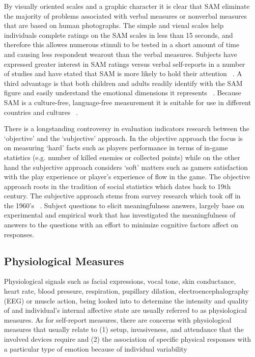 By visually oriented scales and a graphic character it is clear that SAM eliminate the majority of problems associated with verbal measures or nonverbal measures that are based on human photographs. The simple and visual scales help individuals complete ratings on the SAM scales in less than 15 seconds, and therefore this allowes numerous stimuli to be tested in a short amount of time and causing less respondent wearout than the verbal measures. Subjects have expressed greater interest in SAM ratings versus verbal self-reports in a number of studies and have stated that SAM is more likely to hold their attention ~\cite{lang1985cognitive}. A third advantage is that both children and adults readily identify with the SAM figure and easily understand the emotional dimensions it represents ~\cite{lang1985cognitive}. Because SAM is a culture-free, language-free measurement it is suitable for use in different countries and cultures ~\cite{bradley1993affective}.

There is a longstanding controversy in evaluation indicators research between the `objective' and the `subjective' approach. In the objective approach the focus is on measuring `hard' facts such as players performance in terms of in-game statistics (e.g. number of killed enemies or collected points) while on the other hand the subjective approach considers `soft' matters such as gamers satisfaction with the play experience or player's experience of flow in the game. The objective approach roots in the tradition of social statistics which dates back to 19th century. The subjective approach stems from survey research which took off in the 1960's ~\cite{veenhoven2002social}. Subject questions to elicit meaningfulness answers, largely base on experimental and empirical work that has investigated the meaningfulness of answers to the questions with an effort to minimize cognitive factors affect on responses.

\subsection{Physiological Measures}

Physiological signals such as facial expressions, vocal tone, skin conductance, heart rate, blood pressure, respiration, pupillary dilation, electroencephalography (EEG) or muscle action, being looked into to determine the intensity and quality of and individual's internal affective state are usually referred to as physiological measures. As for self-report measures, there are concerns with physiological measures that usually relate to (1) setup, invasiveness, and attendance that the involved devices require and (2) the association of specific physical responses with a particular type of emotion because of individual variability ~\cite{depaula2005cognitive}


